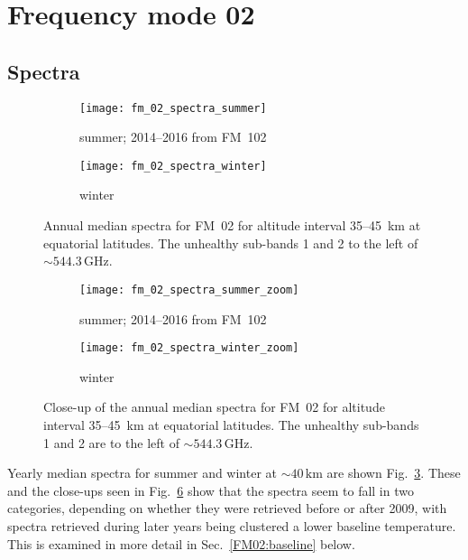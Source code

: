 \section{Frequency mode 02}
\label{FM02}

\subsection{Spectra}
\label{FM02:spectra}

\begin{figure}[ht]
    \centering
    \begin{subfigure}[b]{0.9545\textwidth}
        \texttt{[image: fm\_02\_spectra\_summer]}
        \caption{summer; 2014--2016 from FM~102}\label{fig:spectra:02:summer}
    \end{subfigure}
    \begin{subfigure}[b]{0.9545\textwidth}
        \texttt{[image: fm\_02\_spectra\_winter]}
        \caption{winter}\label{fig:spectra:02:winter}
    \end{subfigure}
    \caption{Annual median spectra for FM~02 for altitude interval 35--45~km at
        equatorial latitudes. The unhealthy sub-bands 1 and 2 to the left of
        $\sim544.3\,\mathrm{GHz}$.
        }\label{fig:spectra:02}
\end{figure}

\begin{figure}[ht]
    \centering
    \begin{subfigure}[b]{0.9545\textwidth}
        \texttt{[image: fm\_02\_spectra\_summer\_zoom]}
        \caption{summer; 2014--2016 from
            FM~102}\label{fig:spectra:02:summer:closeup}
    \end{subfigure}
    \begin{subfigure}[b]{0.9545\textwidth}
        \texttt{[image: fm\_02\_spectra\_winter\_zoom]}
        \caption{winter}\label{fig:spectra:02:winter:closeup}
    \end{subfigure}
    \caption{Close-up of the annual median spectra for FM~02 for altitude
        interval 35--45~km at equatorial latitudes.  The unhealthy sub-bands
        1 and 2 are to the left of $\sim544.3\,\mathrm{GHz}$.
        }\label{fig:spectra:02:closeup}
\end{figure}

\noindent
Yearly median spectra for summer and winter at $\sim40\,\mathrm{km}$ are shown
Fig.~\ref{fig:spectra:02}.  These and the close-ups seen in
Fig.~\ref{fig:spectra:02:closeup} show that the spectra seem to fall in two
categories, depending on whether they were retrieved before or after 2009, with
spectra retrieved during later years being clustered a lower baseline
temperature.  This is examined in more detail in Sec.~\ref{FM02:baseline}
below.


